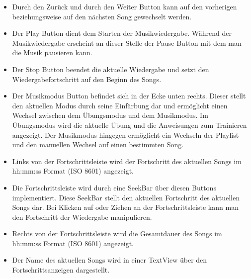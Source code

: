 \documentclass[FIPLY_base.tex]{subfiles}
\begin{document}
\begin{itemize}
\item Durch den Zurück und durch den Weiter Button kann auf den vorherigen beziehungsweise auf den nächsten Song gewechselt werden. 
\item Der Play Button dient dem Starten der Musikwiedergabe. \newline
Während der Musikwiedergabe erscheint an dieser Stelle der Pause Button mit dem man die Musik pausieren kann. 
\item Der Stop Button beendet die aktuelle Wiedergabe und setzt den Wiedergabefortschritt auf den Beginn des Songs. 
\item Der Musikmodus Button befindet sich in der Ecke unten rechts. \newline
Dieser stellt den aktuellen Modus durch seine Einfärbung dar und ermöglicht einen Wechsel zwischen dem Übungsmodus und dem Musikmodus.
Im Übungsmodus wird die aktuelle Übung und die Anweisungen zum Trainieren angezeigt. \newline
Der Musikmodus hingegen ermöglicht ein Wechseln der Playlist und den manuellen Wechsel auf einen bestimmten Song. 
\item Links von der Fortschrittsleiste wird der Fortschritt des aktuellen Songs im hh:mm:ss Format (ISO 8601) angezeigt. 
\item Die Fortschrittsleiste wird durch eine SeekBar über diesen Buttons implementiert. Diese SeekBar stellt den aktuellen Fortschritt des aktuellen Songs dar. 
Bei Klicken auf oder Ziehen an der Fortschrittsleiste kann man den Fortschritt der Wiedergabe manipulieren. 
\item Rechts von der Fortschrittsleiste wird die Gesamtdauer des Songs im hh:mm:ss Format (ISO 8601) angezeigt.
\item Der Name des aktuellen Songs wird in einer TextView über den Fortschrittsanzeigen dargestellt.
\end{itemize}
\end{document}
